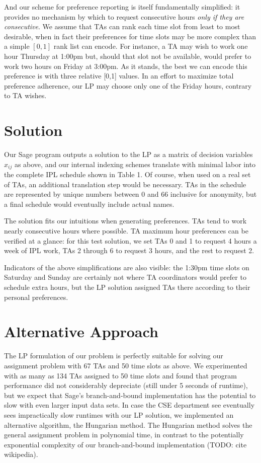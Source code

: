 \documentclass{article}
\begin{document}
\begin{multicols}{2}
And our scheme for preference reporting is itself fundamentally simplified: it provides no mechanism by which to request consecutive hours \textit{only if they are consecutive}. We assume that TAs can rank each time slot from least to most desirable, when in fact their preferences for time slots may be more complex than a simple $[0, 1]$ rank list can encode. For instance, a TA may wish to work one hour Thursday at 1:00pm but, should that slot not be available, would prefer to work two hours on Friday at 3:00pm. As it stands, the best we can encode this preference is with three relative [0,1] values. In an effort to maximize total preference adherence, our LP may choose only one of the Friday hours, contrary to TA wishes.

\section*{Solution}

Our Sage program outputs a solution to the LP as a matrix of decision variables $x_{ij}$ as above, and our internal indexing schemes translate with minimal labor into the complete IPL schedule shown in Table 1. Of course, when used on a real set of TAs, an additional translation step would be necessary. TAs in the schedule are represented by unique numbers between 0 and 66 inclusive for anonymity, but a final schedule would eventually include actual names.

The solution fits our intuitions when generating preferences. TAs tend to work nearly consecutive hours where possible. TA maximum hour preferences can be verified at a glance: for this test solution, we set TAs 0 and 1 to request 4 hours a week of IPL work, TAs 2 through 6 to request 3 hours, and the rest to request 2.

Indicators of the above simplifications are also visible: the 1:30pm time slots on Saturday and Sunday are certainly not where TA coordinators would prefer to schedule extra hours, but the LP solution assigned TAs there according to their personal preferences.

\section*{Alternative Approach}

The LP formulation of our problem is perfectly suitable for solving our assignment problem with 67 TAs and 50 time slots as above. We experimented with as many as 134 TAs assigned to 50 time slots and found that program performance did not considerably depreciate (still under 5 seconds of runtime), but we expect that Sage's branch-and-bound implementation has the potential to slow with even larger input data sets. In case the CSE department see eventually sees impractically slow runtimes with our LP solution, we implemented an alternative algorithm, the Hungarian method. The Hungarian method solves the general assignment problem in polynomial time, in contrast to the potentially exponential complexity of our branch-and-bound implementation (TODO: cite wikipedia).


\end{multicols}
\end{document}
